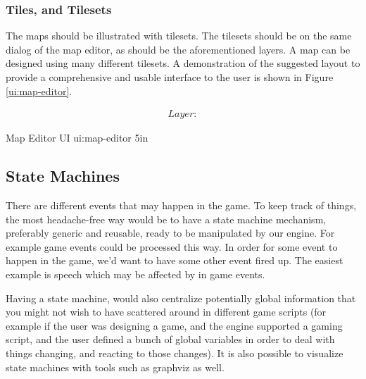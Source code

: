 \subsubsection{Tiles, and Tilesets}

The maps should be illustrated with tilesets. The tilesets should be on the
same dialog of the map editor, as should be the aforementioned layers. A map
can be designed using many different tilesets. A demonstration of the
suggested layout to provide a comprehensive and usable interface to the user
is shown in Figure \ref{ui:map-editor}.

\begin{equation}
\begin{split}
Layer\colon 
\end{split}
\end{equation}

%
       {Map Editor UI}%
       {ui:map-editor}%
       {5in}


\subsection{State Machines}

There are different events that may happen in the game. To keep track of 
things, the most headache-free way would be to have a state machine mechanism,
preferably generic and reusable, ready to be manipulated by our engine. For
example game events could be processed this way. In order for some event to
happen in the game, we'd want to have some other event fired up. The easiest
example is speech which may be affected by in game events.

Having a state machine, would also centralize potentially global information
that you might not wish to have scattered around in different game scripts (for
example if the user was designing a game, and the engine supported a gaming
script, and the user defined a bunch of global variables in order to deal with
things changing, and reacting to those changes). It is also possible to visualize
state machines with tools such as graphviz as well.